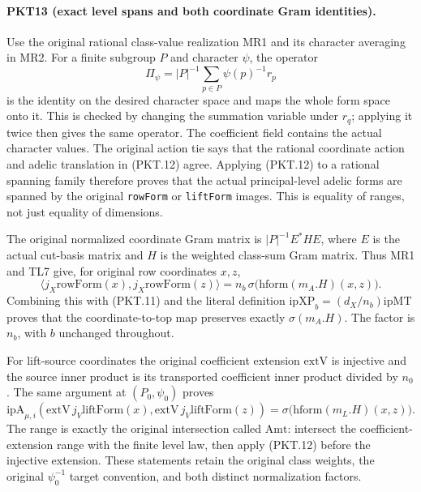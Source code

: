 \paragraph{PKT13 (exact level spans and both coordinate Gram identities).}\label{claim:PKT13}
Use the original rational class-value realization MR1 and its character
averaging in MR2.  For a finite subgroup $P$ and character $\psi$, the
operator
\[
 \Pi_\psi=|P|^{-1}\sum_{p\in P}\psi(p)^{-1}r_p
 \tag{PKT.12}
\]
is the identity on the desired character space and maps the whole form
space onto it.  This is checked by changing the summation variable under
$r_q$; applying it twice then gives the same operator.  The coefficient
field contains the actual character values.  The original action tie says
that the rational coordinate action and adelic translation in (PKT.12)
agree.  Applying (PKT.12) to a rational spanning family therefore proves
that the actual principal-level adelic forms are spanned by the original
\texttt{rowForm} or \texttt{liftForm} images.  This is equality of ranges,
not just equality of dimensions.

The original normalized coordinate Gram matrix is
$|P|^{-1}E^*HE$, where $E$ is the actual cut-basis matrix and $H$ is the
weighted class-sum Gram matrix.  Thus MR1 and TL7 give, for original row
coordinates $x,z$,
\[
 \langle j_X\mathrm{rowForm}(x),j_X\mathrm{rowForm}(z)\rangle
 =n_b\,\sigma\bigl(\mathrm{hform}(m_A.H)(x,z)\bigr).
 \tag{PKT.13}
\]
Combining this with (PKT.11) and the literal definition
$\mathrm{ipXP}_b=(d_X/n_b)\mathrm{ipMT}$ proves that the coordinate-to-top
map preserves exactly $\sigma(m_A.H)$.  The factor is $n_b$, with $b$
unchanged throughout.

For lift-source coordinates the original coefficient extension
$\mathrm{extV}$ is injective and the source inner product is its transported
coefficient inner product divided by $n_0$.  The same argument at
$(P_0,\psi_0)$ proves
\[
 \mathrm{ipA}_{\mu,i}
  (\mathrm{extV}\,j_V\mathrm{liftForm}(x),
   \mathrm{extV}\,j_V\mathrm{liftForm}(z))
 =\sigma\bigl(\mathrm{hform}(m_L.H)(x,z)\bigr).
 \tag{PKT.14}
\]
The range is exactly the original intersection called $\mathrm{Amt}$:
intersect the coefficient-extension range with the finite level law, then
apply (PKT.12) before the injective extension.  These statements retain the
original class weights, the original $\psi_0^{-1}$ target convention, and
both distinct normalization factors.

